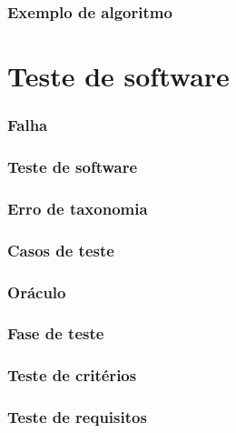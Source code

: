 \documentclass[utf8, usepdftitle=false, svgnames, color={table,
fixpdftex, hyperref, fixinclude, xcdraw}, t, brazil]{beamer}
\begin{document}
 \section{Exemplo de algoritmo}
 
 
 \part{Teste de software}
 
 \section{Falha}
 
 
 \section{Teste de software}
 
 
 \section{Erro de taxonomia}
 
 
 \section{Casos de teste}
 
 
 \section{Oráculo}
 
 
 \section{Fase de teste}
 
 
 \section{Teste de critérios}
 
 
 \section{Teste de requisitos}
 
\end{document}
